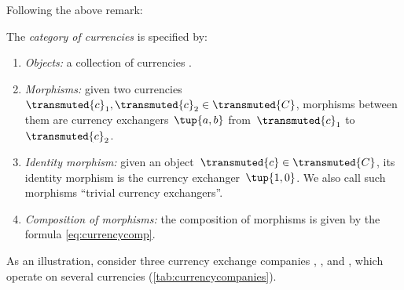 Following the above remark:

\begin{definition}
    The \emph{category of currencies} \Curr is specified by:
    \begin{enumerate}
        \item \emph{Objects:} a collection of currencies .
        \item \emph{Morphisms:} given two currencies~$\transmuted{c}_1, \transmuted{c}_2\in \transmuted{C}$, morphisms between them are currency exchangers~$\tup{a,b}$ from~$\transmuted{c}_1$ to~$\transmuted{c}_2$.
        \item \emph{Identity morphism:} given an object~$\transmuted{c} \in \transmuted{C}$, its identity morphism is the currency exchanger~$\tup{1,0}$. We also call such morphisms ``trivial currency exchangers''.
        \item \emph{Composition of morphisms:} the composition of morphisms is given by the formula \cref{eq:currencycomp}.
    \end{enumerate}
\end{definition}



As an illustration, consider three currency exchange companies , , and , which operate on several currencies (\cref{tab:currencycompanies}).

